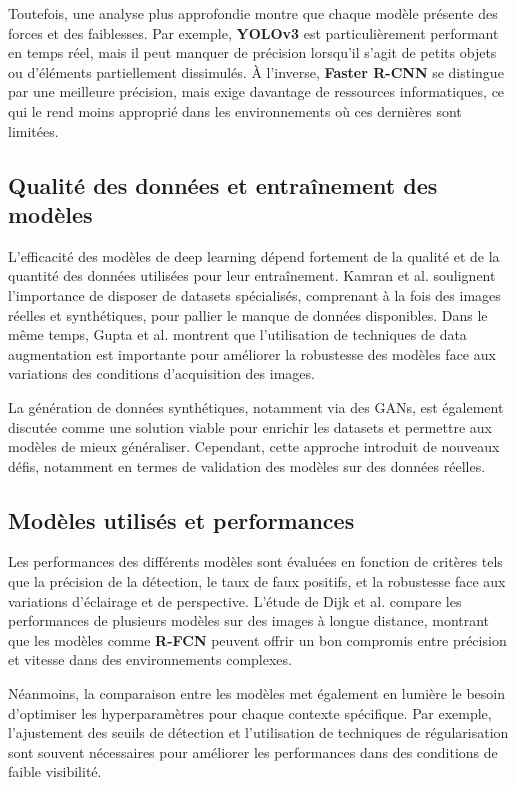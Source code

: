 Toutefois, une analyse plus approfondie montre que chaque modèle présente des forces et des faiblesses. Par exemple, \textbf{YOLOv3} est particulièrement performant en temps réel, mais il peut manquer de précision lorsqu'il s'agit de petits objets ou d'éléments partiellement dissimulés. À l'inverse, \textbf{Faster R-CNN} se distingue par une meilleure précision, mais exige davantage de ressources informatiques, ce qui le rend moins approprié dans les environnements où ces dernières sont limitées.

\subsection{Qualité des données et entraînement des modèles}

L'efficacité des modèles de deep learning dépend fortement de la qualité et de la quantité des données utilisées pour leur entraînement. Kamran et al. \cite{kamran2020} soulignent l'importance de disposer de datasets spécialisés, comprenant à la fois des images réelles et synthétiques, pour pallier le manque de données disponibles. Dans le même temps, Gupta et al. \cite{gupta2021} montrent que l'utilisation de techniques de data augmentation est importante pour améliorer la robustesse des modèles face aux variations des conditions d'acquisition des images.

La génération de données synthétiques, notamment via des GANs, est également discutée comme une solution viable pour enrichir les datasets et permettre aux modèles de mieux généraliser. Cependant, cette approche introduit de nouveaux défis, notamment en termes de validation des modèles sur des données réelles.

\subsection{Modèles utilisés et performances}

Les performances des différents modèles sont évaluées en fonction de critères tels que la précision de la détection, le taux de faux positifs, et la robustesse face aux variations d'éclairage et de perspective. L'étude de Dijk et al. \cite{spie2020} compare les performances de plusieurs modèles sur des images à longue distance, montrant que les modèles comme \textbf{R-FCN} peuvent offrir un bon compromis entre précision et vitesse dans des environnements complexes.

Néanmoins, la comparaison entre les modèles met également en lumière le besoin d'optimiser les hyperparamètres pour chaque contexte spécifique. Par exemple, l'ajustement des seuils de détection et l'utilisation de techniques de régularisation sont souvent nécessaires pour améliorer les performances dans des conditions de faible visibilité.

